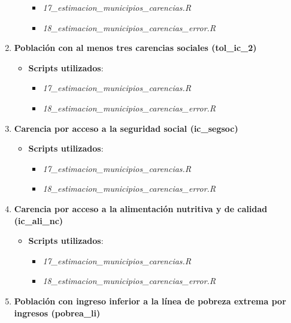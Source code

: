 \documentclass[
  12pt,
]{book}
\providecommand{\tightlist}{%
  \setlength{\itemsep}{0pt}\setlength{\parskip}{0pt}}
\begin{document}
\begin{enumerate}
\begin{itemize}
    \begin{itemize}
    \tightlist
    \item
      \emph{17\_estimacion\_municipios\_carencias.R}
    \item
      \emph{18\_estimacion\_municipios\_carencias\_error.R}
    \end{itemize}
  \end{itemize}
\item
  \textbf{Población con al menos tres carencias sociales (tol\_ic\_2)}

  \begin{itemize}
  \tightlist
  \item
    \textbf{Scripts utilizados}:

    \begin{itemize}
    \tightlist
    \item
      \emph{17\_estimacion\_municipios\_carencias.R}
    \item
      \emph{18\_estimacion\_municipios\_carencias\_error.R}
    \end{itemize}
  \end{itemize}
\item
  \textbf{Carencia por acceso a la seguridad social (ic\_segsoc)}

  \begin{itemize}
  \tightlist
  \item
    \textbf{Scripts utilizados}:

    \begin{itemize}
    \tightlist
    \item
      \emph{17\_estimacion\_municipios\_carencias.R}
    \item
      \emph{18\_estimacion\_municipios\_carencias\_error.R}
    \end{itemize}
  \end{itemize}
\item
  \textbf{Carencia por acceso a la alimentación nutritiva y de calidad (ic\_ali\_nc)}

  \begin{itemize}
  \tightlist
  \item
    \textbf{Scripts utilizados}:

    \begin{itemize}
    \tightlist
    \item
      \emph{17\_estimacion\_municipios\_carencias.R}
    \item
      \emph{18\_estimacion\_municipios\_carencias\_error.R}
    \end{itemize}
  \end{itemize}
\item
  \textbf{Población con ingreso inferior a la línea de pobreza extrema por ingresos (pobrea\_li)}


\end{enumerate}
\end{document}

